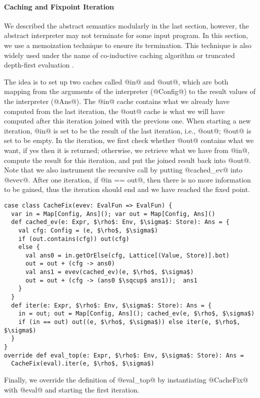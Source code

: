\paragraph{Caching and Fixpoint Iteration}

We described the abstract semantics modularly in the last section, however, the
abstract interpreter may not terminate for some input program. In this section,
we use a memoization technique to ensure its termination. This technique is also
widely used under the name of co-inductive caching algorithm
\cite{DBLP:journals/pacmpl/DaraisLNH17, Wei:2018:RAA:3243631.3236800} or
truncated depth-first evaluation \cite{Rosendahl:AbsIntPL}.

The idea is to set up two caches called @in@ and @out@, which are both mapping
from the arguments of the interpreter (@Config@) to the result values of the
interpreter (@Ans@). The @in@ cache contains what we already have computed from
the last iteration, the @out@ cache is what we will have computed after this
iteration joined with the previous one. When starting a new iteration, @in@ is
set to be the result of the last iteration, i.e., @out@; @out@ is set to be
empty. In the iteration, we first check whether @out@ contains what we want, if
yes then it is returned; otherwise, we retrieve what we have from @in@, compute
the result for this iteration, and put the joined result back into @out@. Note
that we also instrument the recursive call by putting @cached_ev@ into @evev@.
After one iteration, if @in == out@, then there is no more information to be
gained, thus the iteration should end and we have reached the fixed point.

\begin{lstlisting}
case class CacheFix(evev: EvalFun => EvalFun) {
  var in = Map[Config, Ans](); var out = Map[Config, Ans]()
  def cached_ev(e: Expr, $\rho$: Env, $\sigma$: Store): Ans = {
    val cfg: Config = (e, $\rho$, $\sigma$)
    if (out.contains(cfg)) out(cfg)
    else {
      val ans0 = in.getOrElse(cfg, Lattice[(Value, Store)].bot)
      out = out + (cfg -> ans0)
      val ans1 = evev(cached_ev)(e, $\rho$, $\sigma$)
      out = out + (cfg -> (ans0 $\sqcup$ ans1));  ans1
    }
  }
  def iter(e: Expr, $\rho$: Env, $\sigma$: Store): Ans = {
    in = out; out = Map[Config, Ans](); cached_ev(e, $\rho$, $\sigma$)
    if (in == out) out((e, $\rho$, $\sigma$)) else iter(e, $\rho$, $\sigma$)
  }
}
override def eval_top(e: Expr, $\rho$: Env, $\sigma$: Store): Ans = 
  CacheFix(eval).iter(e, $\rho$, $\sigma$)
\end{lstlisting}

Finally, we override the definition of @eval_top@ by instantiating @CacheFix@
with @eval@ and starting the first iteration.
